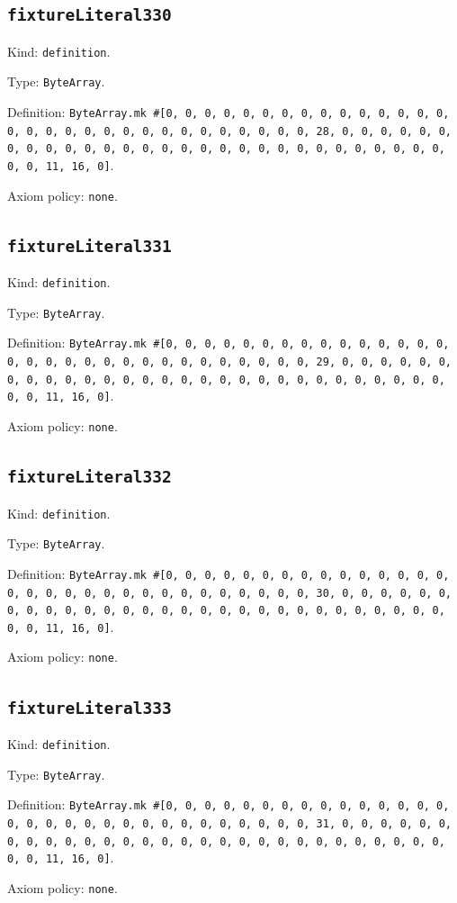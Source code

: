 \documentclass[11pt]{article}
\begin{document}
\subsection*{\texttt{fixtureLiteral330}}
\noindent Kind: \texttt{definition}.\par
\noindent Type: \texttt{ByteArray}.\par
\noindent Definition: \texttt{ByteArray.mk \#[0, 0, 0, 0, 0, 0, 0, 0, 0, 0, 0, 0, 0, 0, 0, 0, 0, 0, 0, 0, 0, 0, 0, 0, 0, 0, 0, 0, 0, 0, 0, 28, 0, 0, 0, 0, 0, 0, 0, 0, 0, 0, 0, 0, 0, 0, 0, 0, 0, 0, 0, 0, 0, 0, 0, 0, 0, 0, 0, 0, 0, 0, 0, 11, 16, 0]}.\par
\noindent Axiom policy: \texttt{none}.\par
\subsection*{\texttt{fixtureLiteral331}}
\noindent Kind: \texttt{definition}.\par
\noindent Type: \texttt{ByteArray}.\par
\noindent Definition: \texttt{ByteArray.mk \#[0, 0, 0, 0, 0, 0, 0, 0, 0, 0, 0, 0, 0, 0, 0, 0, 0, 0, 0, 0, 0, 0, 0, 0, 0, 0, 0, 0, 0, 0, 0, 29, 0, 0, 0, 0, 0, 0, 0, 0, 0, 0, 0, 0, 0, 0, 0, 0, 0, 0, 0, 0, 0, 0, 0, 0, 0, 0, 0, 0, 0, 0, 0, 11, 16, 0]}.\par
\noindent Axiom policy: \texttt{none}.\par
\subsection*{\texttt{fixtureLiteral332}}
\noindent Kind: \texttt{definition}.\par
\noindent Type: \texttt{ByteArray}.\par
\noindent Definition: \texttt{ByteArray.mk \#[0, 0, 0, 0, 0, 0, 0, 0, 0, 0, 0, 0, 0, 0, 0, 0, 0, 0, 0, 0, 0, 0, 0, 0, 0, 0, 0, 0, 0, 0, 0, 30, 0, 0, 0, 0, 0, 0, 0, 0, 0, 0, 0, 0, 0, 0, 0, 0, 0, 0, 0, 0, 0, 0, 0, 0, 0, 0, 0, 0, 0, 0, 0, 11, 16, 0]}.\par
\noindent Axiom policy: \texttt{none}.\par
\subsection*{\texttt{fixtureLiteral333}}
\noindent Kind: \texttt{definition}.\par
\noindent Type: \texttt{ByteArray}.\par
\noindent Definition: \texttt{ByteArray.mk \#[0, 0, 0, 0, 0, 0, 0, 0, 0, 0, 0, 0, 0, 0, 0, 0, 0, 0, 0, 0, 0, 0, 0, 0, 0, 0, 0, 0, 0, 0, 0, 31, 0, 0, 0, 0, 0, 0, 0, 0, 0, 0, 0, 0, 0, 0, 0, 0, 0, 0, 0, 0, 0, 0, 0, 0, 0, 0, 0, 0, 0, 0, 0, 11, 16, 0]}.\par
\noindent Axiom policy: \texttt{none}.\par
\end{document}
